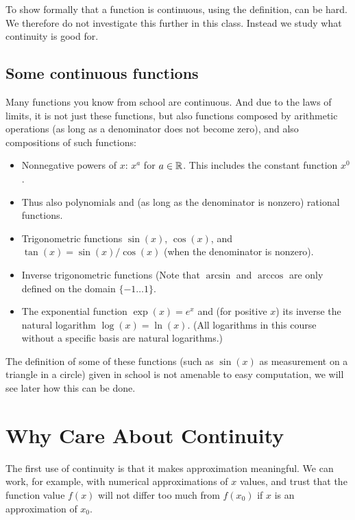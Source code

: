 To show formally that a function is continuous, using the definition, can be
hard.  We therefore do not investigate
this further in this class. Instead
we study what continuity is good for.

\subsection{Some continuous functions}

Many functions you know from school are continuous. And due to the laws of
limits, it is not just these functions, but also functions composed by
arithmetic operations (as long as a denominator does not become zero), and
also compositions of such functions:

\begin{itemize}
\item Nonnegative powers of $x$: $x^a$ for $a\in{\mathbb R}$. This includes the constant function
$x^0$.
\item Thus also polynomials and (as long as the denominator is nonzero) rational
functions.
\item Trigonometric functions $\sin(x)$, $\cos(x)$, and $\tan(x)=\sin(x)/\cos(x)$ (when
the denominator is nonzero).
\item Inverse trigonometric functions (Note that $\arcsin$ and $\arccos$ are only defined
on the domain $\{-1\ldots 1\}$.
\item The exponential function $\exp(x)=e^x$ and (for positive $x$) its
inverse the natural logarithm $\log(x)=\ln(x)$. (All logarithms in this
course without a specific basis are natural logarithms.)
\end{itemize}

The definition of some of these functions (such as $\sin(x)$ as measurement
on a triangle in a circle) given in
school is not amenable to easy computation, we will see later
 how this can be done.

\section{Why Care About Continuity}
\label{secwhycont}

The first use of continuity is that it makes approximation meaningful. We can work, for
example, with numerical approximations of $x$ values, and trust that the function value
$f(x)$ will not differ too much from $f(x_0)$ if $x$ is an approximation of $x_0$.

